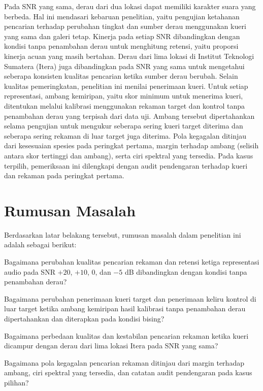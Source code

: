 Pada SNR yang sama, derau dari dua lokasi dapat memiliki karakter suara
yang berbeda. Hal ini mendasari kebaruan penelitian, yaitu pengujian
ketahanan pencarian terhadap perubahan tingkat dan sumber derau
menggunakan kueri yang sama dan galeri tetap. Kinerja pada setiap SNR
dibandingkan dengan kondisi tanpa penambahan derau untuk menghitung
retensi, yaitu proporsi kinerja acuan yang masih bertahan. Derau dari
lima lokasi di Institut Teknologi Sumatera (Itera) juga dibandingkan
pada SNR yang sama untuk mengetahui seberapa konsisten kualitas
pencarian ketika sumber derau berubah. Selain kualitas pemeringkatan,
penelitian ini menilai penerimaan kueri. Untuk setiap representasi,
ambang kemiripan, yaitu skor minimum untuk menerima kueri, ditentukan
melalui kalibrasi menggunakan rekaman target dan kontrol tanpa
penambahan derau yang terpisah dari data uji. Ambang tersebut
dipertahankan selama pengujian untuk mengukur seberapa sering kueri
target diterima dan seberapa sering rekaman di luar target juga
diterima. Pola kegagalan ditinjau dari kesesuaian spesies pada peringkat
pertama, margin terhadap ambang (selisih antara skor tertinggi dan
ambang), serta ciri spektral yang tersedia. Pada kasus terpilih,
pemeriksaan ini dilengkapi dengan audit pendengaran terhadap kueri dan
rekaman pada peringkat pertama.

\section{Rumusan Masalah}
Berdasarkan latar belakang tersebut, rumusan masalah dalam penelitian ini adalah sebagai berikut:

\begin{daftarBernomor}
    \setlength{\emergencystretch}{2em}
    \item Bagaimana perubahan kualitas pencarian rekaman dan retensi ketiga representasi audio pada SNR $+20$, $+10$, $0$, dan $-5$ dB dibandingkan dengan kondisi tanpa penambahan derau?

    \item Bagaimana perubahan penerimaan kueri target dan penerimaan keliru kontrol di luar target ketika ambang kemiripan hasil kalibrasi tanpa penambahan derau dipertahankan dan diterapkan pada kondisi bising?

    \item Bagaimana perbedaan kualitas dan kestabilan pencarian rekaman ketika kueri dicampur dengan derau dari lima lokasi Itera pada SNR yang sama?

    \item Bagaimana pola kegagalan pencarian rekaman ditinjau dari margin terhadap ambang, ciri spektral yang tersedia, dan catatan audit pendengaran pada kasus pilihan?
\end{daftarBernomor}

